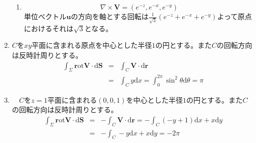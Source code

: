 \documentclass{jarticle}
\def\d{\mathrm d}
\def\rot{\mathrm{\bm rot}}
\begin{document}
\begin{enumerate}
\begin{enumerate}
        \item
          \[\nabla \times {\bm V} = (e^{-z},e^{-x},e^{-y})\]
          単位ベクトル$\bm u$の方向を軸とする回転は$\frac{1}{\sqrt 3}(e^{-z}+e^{-x}+e^{-y})$よって原点におけるそれは$\sqrt{3}$となる。
      \end{enumerate}
    \item
      $C$を$xy$平面に含まれる原点を中心とした半径$1$の円とする。また$C$の回転方向は反時計周りとする。
      \begin{eqnarray*}
        \int_\Sigma \rot {\bm V} \cdot \d {\bm S} & = & \int_C {\bm V} \cdot \d {\bm r} \\
        & = & \int_C y \d x = \int_0^{2\pi} \sin^2 \theta \d \theta = \pi
      \end{eqnarray*}
    \item
    　$C$を$z=1$平面に含まれる$(0,0,1)$を中心とした半径$1$の円とする。また$C$の回転方向は反時計周りとする。
      \begin{eqnarray*}
        \int_\Sigma \rot {\bm V} \cdot \d {\bm S} & = & - \int_C {\bm V} \cdot \d {\bm r} = - \int_C (-y+1) \d x + x \d y \\
        & = & - \int_C -y \d x + x \d y = - 2 \pi
      \end{eqnarray*}
  \end{enumerate}
\end{document}
